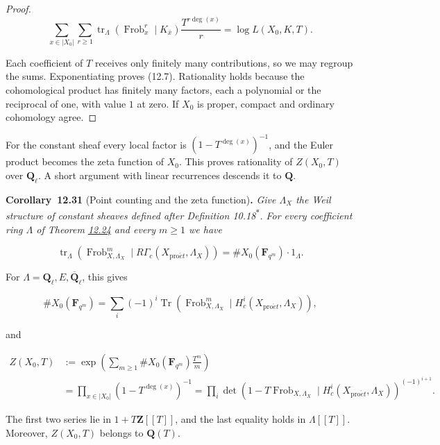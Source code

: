 \documentclass[11pt]{article}
\newenvironment{bpstatement}[2]{\par\addvspace{0.6\baselineskip}\noindent\textbf{#1}#2\textbf{.}\enspace\ignorespaces}
  {\par\addvspace{0.4\baselineskip}}
\newenvironment{bpstatementit}[2]{\begin{bpstatement}{#1}{#2}\itshape\ignorespaces}{\end{bpstatement}}
\newcommand{\bpout}[1]{#1\textsuperscript{\hyperlink{bp-outside}{\ensuremath{\ast}}}}
\begin{document}
\begin{proof}[{Proof}]
\[
\sum_{x\in|X_0|}\sum_{r\geq1}
\operatorname{tr}_{\Lambda}(\operatorname{Frob}_x^r\mid K_{\bar x})
\frac{T^{r\deg(x)}}{r}
=\log L(X_0,K,T).
\]

Each coefficient of \(T\) receives only finitely many contributions, so we may regroup the sums. Exponentiating proves (12.7). Rationality holds because the cohomological product has finitely many factors, each a polynomial or the reciprocal of one, with value \(1\) at zero. If \(X_0\) is proper, compact and ordinary cohomology agree.
\end{proof}

\label{bp94}%
For the constant sheaf every local factor is \((1-T^{\deg(x)})^{-1}\), and the Euler product becomes the zeta function of \(X_0\). This proves rationality of \(Z(X_0,T)\) over \(\mathbf Q_\ell\). A short argument with linear recurrences descends it to \(\mathbf Q\).

\label{bp95}%
\begin{bpstatementit}{Corollary~12.31}{ (Point counting and the zeta function)}
Give \(\Lambda_X\) the Weil structure of constant sheaves defined after Definition \bpout{10.18}. For every coefficient ring \(\Lambda\) of Theorem \hyperref[bp73]{12.24} and every \(m\geq1\) we have

\[
\operatorname{tr}_{\Lambda}
(\operatorname{Frob}_{X,\Lambda_X}^m\mid R\Gamma_c(X_{\mathrm{pro}\acute{e}t},\Lambda_X))
=\#X_0(\mathbf F_{q^m})\cdot1_{\Lambda}.
\tag{12.9}
\]

For \(\Lambda=\mathbf Q_\ell,E,\overline{\mathbf Q}_\ell\), this gives

\[
\#X_0(\mathbf F_{q^m})
=\sum_i(-1)^i\operatorname{Tr}
(\operatorname{Frob}_{X,\Lambda_X}^m\mid H_c^i(X_{\mathrm{pro}\acute{e}t},\Lambda_X)),
\]

and

\[
\begin{aligned}
Z(X_0,T)
&:=\exp\left(\sum_{m\geq1}
\#X_0(\mathbf F_{q^m})\frac{T^m}{m}\right)\\
&=\prod_{x\in|X_0|}(1-T^{\deg(x)})^{-1}
=\prod_i\det(1-T\operatorname{Frob}_{X,\Lambda_X}\mid H_c^i(X_{\mathrm{pro}\acute{e}t},\Lambda_X))^{(-1)^{i+1}}.
\end{aligned}
\]

The first two series lie in \(1+T\mathbf Z[[T]]\), and the last equality holds in \(\Lambda[[T]]\). Moreover, \(Z(X_0,T)\) belongs to \(\mathbf Q(T)\).
\end{bpstatementit}
\end{document}
